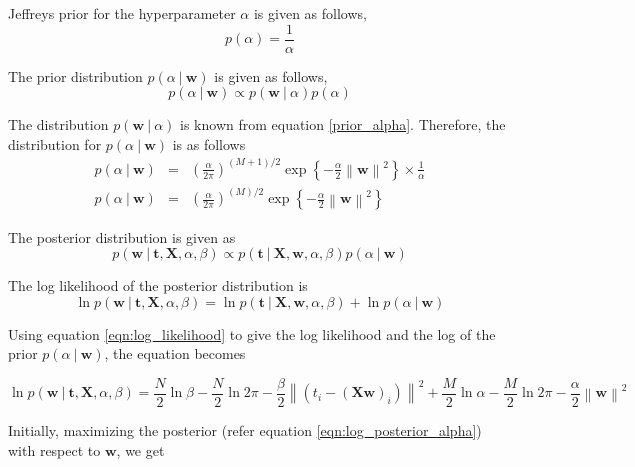 \documentclass[11pt]{article}
\newcommand\given[1][]{\:#1\vert\:}
\newcommand{\norm}[1]{\left\lVert#1\right\rVert}
\begin{document}
Jeffreys prior for the hyperparameter $\alpha$ is given as follows,
\begin{equation}
    p(\alpha) = \frac{1}{\alpha}
\end{equation}

The prior distribution $p(\alpha \given \bm{w})$ is given as follows,
\begin{equation}
    p(\alpha \given \bm{w}) \propto p(\bm{w} \given \alpha) p(\alpha)
\end{equation}

The distribution $p(\bm{w} \given \alpha)$ is known from equation \ref{prior_alpha}. Therefore, the distribution for $p(\alpha \given \bm{w})$ is as follows
\begin{eqnarray}
    p(\alpha \given \bm{w}) 
    &=&
    \left( \frac{\alpha}{2\pi}\right)^{\left( M+1\right)/2} \exp{\left\{ -\frac{\alpha}{2}\norm{\bm{w}}^2\right\}} \times \frac{1}{\alpha} \\
    p(\alpha \given \bm{w}) 
    &=& 
    \left( \frac{\alpha}{2\pi}\right)^{\left( M\right)/2} \exp{\left\{ -\frac{\alpha}{2}\norm{\bm{w}}^2\right\}}
\end{eqnarray}

The posterior distribution is given as
\begin{equation}
    p(\bm{w} \given \bm{t}, \bm{X}, \alpha, \beta) \propto p(\bm{t} \given \bm{X}, \bm{w}, \alpha, \beta) p(\alpha \given \bm{w})
\end{equation}

The log likelihood of the posterior distribution is
\begin{equation}
    \ln{p(\bm{w} \given \bm{t}, \bm{X}, \alpha, \beta)} = \ln{p(\bm{t} \given \bm{X}, \bm{w}, \alpha, \beta)} + \ln{p(\alpha \given \bm{w})}
\end{equation}

Using equation \ref{eqn:log_likelihood} to give the log likelihood and the log of the prior $p(\alpha \given \bm{w})$, the equation becomes

\begin{equation} \label{eqn:log_posterior_alpha}
    \ln{p(\bm{w} \given \bm{t}, \bm{X}, \alpha, \beta)} = \frac{N}{2}\ln{\beta} - \frac{N}{2}\ln{2\pi} - \frac{\beta}{2} \norm{\left(t_i - (\bm{X}\bm{w})_i\right)}^2 + \frac{M}{2} \ln{\alpha} -\frac{M}{2}\ln{2\pi} - \frac{\alpha}{2}\norm{\bm{w}}^2
\end{equation}

Initially, maximizing the posterior (refer equation \ref{eqn:log_posterior_alpha}) with respect to $\bm{w}$, we get
\end{document}
